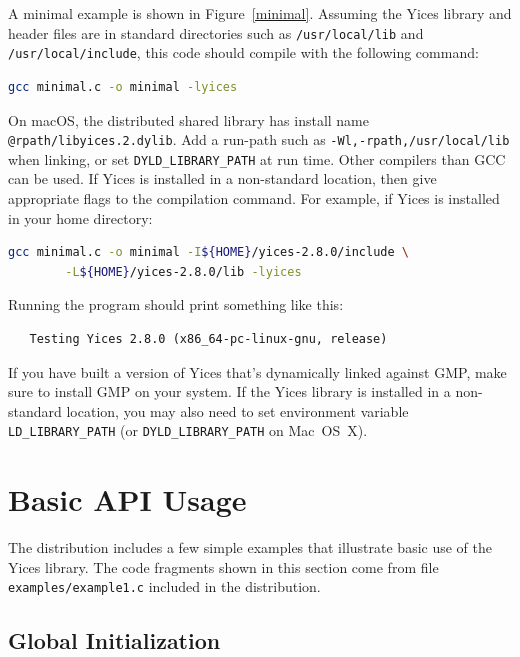 \documentclass[11pt,twoside,fleqn,openright,titlepage]{cslreport}
\begin{document}
\medskip\noindent A minimal example is shown in
Figure~\ref{minimal}. Assuming the Yices library and header files are
in standard directories such as \texttt{/usr/local/lib} and
\texttt{/usr/local/include}, this code should compile with the
following command:
\begin{small}
\begin{lstlisting}[language=sh]
   gcc minimal.c -o minimal -lyices
\end{lstlisting}
\end{small}
On macOS, the distributed shared library has install name
\texttt{@rpath/libyices.2.dylib}. Add a run-path such as
\texttt{-Wl,-rpath,/usr/local/lib} when linking, or set
\texttt{DYLD\_LIBRARY\_PATH} at run time.
Other compilers than GCC can be used. If Yices is installed in a
non-standard location, then give appropriate flags to the compilation
command. For example, if Yices is installed in your home directory:
\begin{small}
\begin{lstlisting}[language=sh]
   gcc minimal.c -o minimal -I${HOME}/yices-2.8.0/include \
        -L${HOME}/yices-2.8.0/lib -lyices
\end{lstlisting}
\end{small}
Running the program should print something like this:
\begin{small}
\begin{verbatim}
   Testing Yices 2.8.0 (x86_64-pc-linux-gnu, release)
\end{verbatim}
\end{small}
If you have built a version of Yices that's dynamically linked against
GMP, make sure to install GMP on your system.  If the Yices library is
installed in a non-standard location, you may also need to set
environment variable \texttt{LD\_LIBRARY\_PATH} (or
\texttt{DYLD\_LIBRARY\_PATH} on Mac~OS~X).


\section{Basic API Usage}

The distribution includes a few simple examples that illustrate basic
use of the Yices library. The code fragments shown in this section
come from file \texttt{examples/example1.c} included in the
distribution.

\subsection*{Global Initialization}
\end{document}
